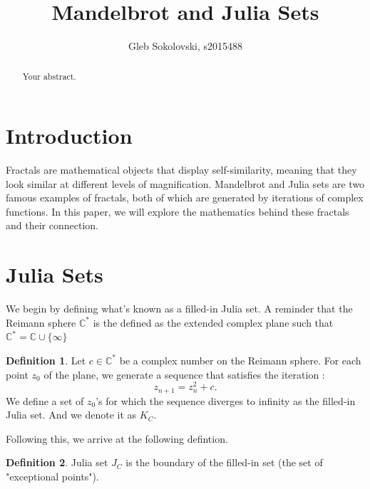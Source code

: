 \documentclass[a4paper,11pt]{article}
\title{Mandelbrot and Julia Sets}
\author{Gleb Sokolovski, s2015488}
\theoremstyle{definition}
\newtheorem{defn}{Definition}[section]%
\numberwithin{equation}{section} %
\begin{document}
\maketitle

\begin{abstract}
Your abstract.
\end{abstract}

\section{Introduction}

Fractals are mathematical objects that display self-similarity, meaning that they look similar at different levels of magnification. Mandelbrot and Julia sets are two famous examples of fractals, both of which are generated by iterations of complex functions. In this paper, we will explore the mathematics behind these fractals and their connection.

\section{Julia Sets}

We begin by defining what's known as a filled-in Julia set. A reminder that the Reimann sphere $\mathbb{C}^*$ is the defined as the extended complex plane such that $\mathbb{C}^* = \mathbb{C} \cup \{ \infty \}$

\begin{defn}
    Let $c \in \mathbb{C}^{*}$ be a complex number on the Reimann sphere. For each point $z_0$ of the plane, we generate a sequence that satisfies the iteration :
    \begin{equation}
        z_{n+1} = z_n^2 + c.\label{eq:1}
    \end{equation}
    We define a set of $z_0$'s for which the sequence diverges to infinity as the filled-in Julia set. And we denote it as $K_C$.
\end{defn}


Following this, we arrive at the following defintion.

\begin{defn}
     Julia set $J_C$ is the boundary of the filled-in set (the set of "exceptional points").
\end{defn}
\end{document}
